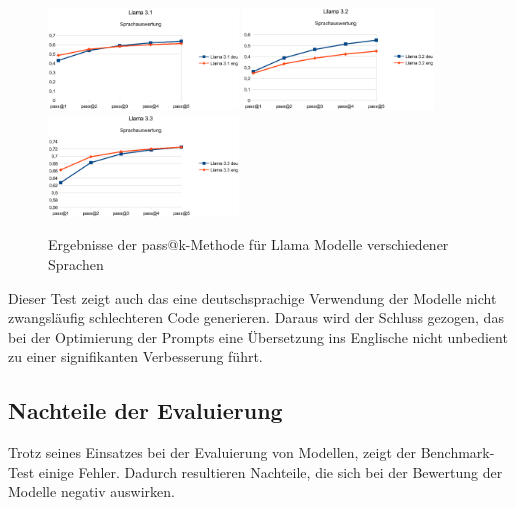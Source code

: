 \begin{figure}[!ht]
	\includegraphics[width=0.45\textwidth]{content/chapter_evaluation/images/llama31_evaluation_lang.eps}
	\includegraphics[width=0.45\textwidth]{content/chapter_evaluation/images/llama32_evaluation_lang.eps}
	\includegraphics[width=0.45\textwidth]{content/chapter_evaluation/images/llama33_evaluation_lang.eps}
	\caption{Ergebnisse der pass@k-Methode für Llama Modelle verschiedener Sprachen}
	\label{img:pass_at_k_results_by_llama_lang}
\end{figure}

Dieser Test zeigt auch das eine deutschsprachige Verwendung der Modelle nicht zwangsläufig schlechteren Code generieren. Daraus wird der Schluss gezogen, das bei der Optimierung der Prompts eine Übersetzung ins Englische nicht unbedient zu einer signifikanten Verbesserung führt.

\subsection{Nachteile der Evaluierung}\label{subsec:disadvantages_of_evaluation}
Trotz seines Einsatzes bei der Evaluierung von Modellen, zeigt der Benchmark-Test einige Fehler. Dadurch resultieren Nachteile, die sich bei der Bewertung der Modelle negativ auswirken.\vspace{0.2cm}

